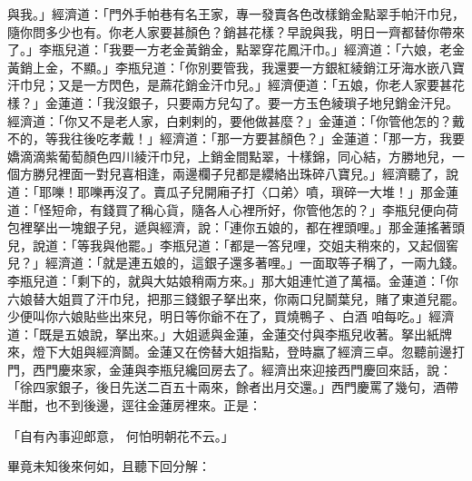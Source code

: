 與我。」經濟道：「門外手帕巷有名王家，專一發賣各色改樣銷金點翠手帕汗巾兒，隨你問多少也有。你老人家要甚顏色？銷甚花樣？早說與我，明日一齊都替你帶來了。」李瓶兒道：「我要一方老金黃銷金，點翠穿花鳳汗巾。」經濟道：「六娘，老金黃銷上金，不顯。」李瓶兒道：「你別要管我，我還要一方銀紅綾銷江牙海水嵌八寶汗巾兒；又是一方閃色，是蔴花銷金汗巾兒。」經濟便道：「五娘，你老人家要甚花樣？」金蓮道：「我沒銀子，只要兩方兒勾了。要一方玉色綾瑣子地兒銷金汗兒。經濟道：「你又不是老人家，白剌剌的，要他做甚麼？」金蓮道：「你管他怎的？戴不的，等我往後吃孝戴！」經濟道：「那一方要甚顏色？」金蓮道：「那一方，我要嬌滴滴紫葡萄顏色四川綾汗巾兒，上銷金間點翠，十樣錦，同心結，方勝地兒，一個方勝兒裡面一對兒喜相逢，兩邊欄子兒都是纓絡出珠碎八寶兒。」經濟聽了，說道：「耶嚛！耶嚛再沒了。賣瓜子兒開廂子打〈口弟〉噴，瑣碎一大堆！」那金蓮道：「怪短命，有錢買了稱心貨，隨各人心裡所好，你管他怎的？」李瓶兒便向荷包裡拏出一塊銀子兒，遞與經濟，說：「連你五娘的，都在裡頭哩。」那金蓮搖著頭兒，說道：「等我與他罷。」李瓶兒道：「都是一答兒哩，交姐夫稍來的，又起個窖兒？」經濟道：「就是連五娘的，這銀子還多著哩。」一面取等子稱了，一兩九錢。李瓶兒道：「剩下的，就與大姑娘稍兩方來。」那大姐連忙道了萬福。金蓮道：「你六娘替大姐買了汗巾兒，把那三錢銀子拏出來，你兩口兒鬬葉兒，賭了東道兒罷。少便叫你六娘貼些出來兒，明日等你爺不在了，買燒鴨子 、白酒 咱每吃。」經濟道：「既是五娘說，拏出來。」大姐遞與金蓮，金蓮交付與李瓶兒收著。拏出紙牌來，燈下大姐與經濟鬬。金蓮又在傍替大姐指點，登時嬴了經濟三卓。忽聽前邊打門，西門慶來家，金蓮與李瓶兒纔回房去了。經濟出來迎接西門慶回來話，說：「徐四家銀子，後日先送二百五十兩來，餘者出月交還。」西門慶罵了幾句，酒帶半酣，也不到後邊，逕往金蓮房裡來。正是：

「自有內事迎郎意，  何怕明朝花不云。」

畢竟未知後來何如，且聽下回分解：
